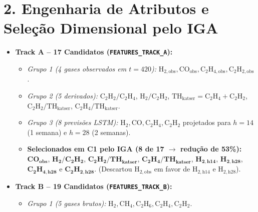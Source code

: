 \documentclass[10pt,a4paper]{article}
\begin{document}
\section*{2. Engenharia de Atributos e Seleção Dimensional pelo IGA}

\begin{summarybox}
\footnotesize
\begin{itemize}[leftmargin=0.5cm, itemsep=2pt]
  \item \textbf{Track A -- 17 Candidatos (\texttt{FEATURES\_TRACK\_A}):}
  \begin{itemize}[leftmargin=0.4cm]
    \item \textit{Grupo 1 (4 gases observados em $t=420$):} $\text{H}_{2,\text{obs}}, \text{CO}_{\text{obs}}, \text{C}_2\text{H}_{4,\text{obs}}, \text{C}_2\text{H}_{2,\text{obs}}$.
    \item \textit{Grupo 2 (5 derivados):} $\text{C}_2\text{H}_2/\text{C}_2\text{H}_4$, $\text{H}_2/\text{C}_2\text{H}_2$, $\text{TH}_{\text{katser}} = \text{C}_2\text{H}_4 + \text{C}_2\text{H}_2$, $\text{C}_2\text{H}_2/\text{TH}_{\text{katser}}$, $\text{C}_2\text{H}_4/\text{TH}_{\text{katser}}$.
    \item \textit{Grupo 3 (8 previsões LSTM):} $\text{H}_2, \text{CO}, \text{C}_2\text{H}_4, \text{C}_2\text{H}_2$ projetados para $h=14$ (1 semana) e $h=28$ (2 semanas).
    \item \textbf{Selecionados em C1 pelo IGA (8 de 17 $\to$ redução de 53\%):} $\mathbf{\text{CO}_{\text{obs}}}$, $\mathbf{\text{H}_2/\text{C}_2\text{H}_2}$, $\mathbf{\text{C}_2\text{H}_2/\text{TH}_{\text{katser}}}$, $\mathbf{\text{C}_2\text{H}_4/\text{TH}_{\text{katser}}}$, $\mathbf{\text{H}_{2,\text{h14}}}$, $\mathbf{\text{H}_{2,\text{h28}}}$, $\mathbf{\text{C}_2\text{H}_{4,\text{h28}}}$ e $\mathbf{\text{C}_2\text{H}_{2,\text{h28}}}$. (Descartou $\text{H}_{2,\text{obs}}$ em favor de $\text{H}_{2,\text{h14}}$ e $\text{H}_{2,\text{h28}}$).
  \end{itemize}
  \item \textbf{Track B -- 19 Candidatos (\texttt{FEATURES\_TRACK\_B}):}
  \begin{itemize}[leftmargin=0.4cm]
    \item \textit{Grupo 1 (5 gases brutos):} $\text{H}_2, \text{CH}_4, \text{C}_2\text{H}_6, \text{C}_2\text{H}_4, \text{C}_2\text{H}_2$.

\end{itemize}
\end{itemize}
\end{summarybox}
\end{document}
